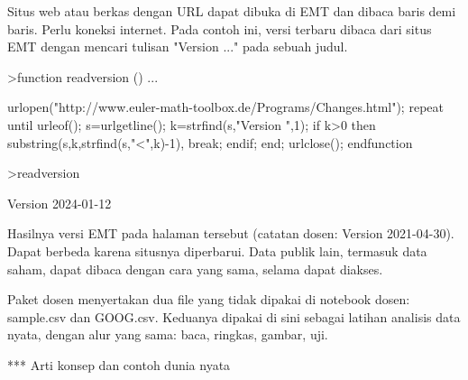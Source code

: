 \documentclass[a4paper,10pt]{article}
\begin{document}
\begin{eulernotebook}
\begin{eulercomment}
\begin{eulercomment}
\begin{eulercomment}
\begin{eulercomment}
\begin{eulercomment}
\begin{eulercomment}
\begin{eulercomment}
\begin{eulercomment}
\begin{eulercomment}
\begin{eulercomment}
\begin{eulercomment}
\begin{eulercomment}
\begin{eulercomment}
\begin{eulercomment}
\begin{eulercomment}
\begin{eulercomment}
\begin{eulercomment}
\begin{eulercomment}
\begin{eulercomment}
\begin{eulercomment}
\begin{eulercomment}
\begin{eulercomment}
\begin{eulercomment}
\begin{eulercomment}
\begin{eulercomment}
\begin{eulercomment}
\begin{eulercomment}
\end{eulercomment}
\begin{eulercomment}
Situs web atau berkas dengan URL dapat dibuka di EMT dan dibaca baris demi baris. Perlu
koneksi internet. Pada contoh ini, versi terbaru dibaca dari situs EMT dengan mencari
tulisan "Version ..." pada sebuah judul.
\end{eulercomment}
\begin{eulerprompt}
>function readversion () ...
\end{eulerprompt}
\begin{eulerudf}
  urlopen("http://www.euler-math-toolbox.de/Programs/Changes.html");
  repeat
    until urleof();
    s=urlgetline();
    k=strfind(s,"Version ",1);
    if k>0 then substring(s,k,strfind(s,"<",k)-1), break; endif;
  end;
  urlclose();
  endfunction
\end{eulerudf}
\begin{eulerprompt}
>readversion
\end{eulerprompt}
\begin{euleroutput}
  Version 2024-01-12
\end{euleroutput}
\begin{eulercomment}
Hasilnya versi EMT pada halaman tersebut (catatan dosen: Version 2021-04-30). Dapat berbeda
karena situsnya diperbarui. Data publik lain, termasuk data saham, dapat dibaca dengan cara
yang sama, selama dapat diakses.

\begin{eulercomment}
\begin{eulercomment}
Paket dosen menyertakan dua file yang tidak dipakai di notebook dosen: sample.csv dan
GOOG.csv. Keduanya dipakai di sini sebagai latihan analisis data nyata, dengan alur yang
sama: baca, ringkas, gambar, uji.

\end{eulercomment}
\begin{eulercomment}
*** Arti konsep dan contoh dunia nyata


\end{eulercomment}
\end{eulercomment}
\end{eulercomment}
\end{eulercomment}
\end{eulercomment}
\end{eulercomment}
\end{eulercomment}
\end{eulercomment}
\end{eulercomment}
\end{eulercomment}
\end{eulercomment}
\end{eulercomment}
\end{eulercomment}
\end{eulercomment}
\end{eulercomment}
\end{eulercomment}
\end{eulercomment}
\end{eulercomment}
\end{eulercomment}
\end{eulercomment}
\end{eulercomment}
\end{eulercomment}
\end{eulercomment}
\end{eulercomment}
\end{eulercomment}
\end{eulercomment}
\end{eulercomment}
\end{eulercomment}
\end{eulercomment}
\end{eulernotebook}
\end{document}
